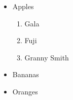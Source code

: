 \documentclass{article}
\begin{document}
\begin{itemize}
    \item Apples
    \begin{enumerate}
        \item Gala
        \item Fuji
        \item Granny Smith
    \end{enumerate}
    \item Bananas
    \item Oranges
\end{itemize}
\end{document}

